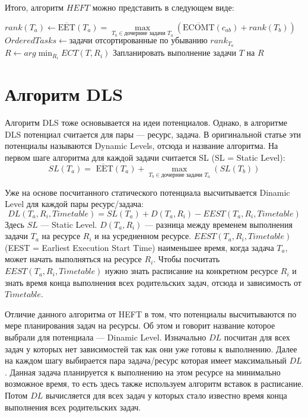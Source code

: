 \begin{spacing}{1.5}
Итого, алгоритм $HEFT$ можно представить в следующем виде:


\begin{algorithmic}
\STATE $rank(T_a) \leftarrow \overline{\mbox{EET}}(T_a) = \max\limits_{T_b \in \text{дочерние задачи $T_a$}}(\overline{\mbox{ECOMT}} (c_{ab}) + rank (T_b))$
\ENDFOR
\STATE $OrderedTasks \leftarrow \text{задачи отсортированные по убыванию $rank_{T_a}$}$
\STATE $R \leftarrow arg\min_{R_i} ECT(T, R_i)$
\STATE Запланировать выполнение задачи $T$ на $R$
\ENDFOR
\end{algorithmic}

\newpage
\section*{Алгоритм DLS}

Алгоритм DLS тоже основывается на идеи потенциалов. Однако, в алгоритме DLS потенциал считается для пары --- ресурс, задача. В оригинальной статье эти потенциалы называются Dynamic Levels, отсюда и название алгоритма. На первом шаге алгоритма для каждой задачи считается SL (SL = Static Level):
$$
SL(T_a) = \overline{\mbox{ EET}}(T_a) + \max_{T_b \in \text{дочерние задачи $T_a$}}(SL (T_b))
$$

Уже на основе посчитанного статического потенциала высчитывается Dinamic Level для каждой пары ресурс/задача:
$$
DL(T_a, R_i, Timetable) = SL(T_a) + D(T_a, R_i) - EEST(T_a, R_i, Timetable)
$$
Здесь $SL$ --- Static Level. $D(T_a, R_i)$ --- разница между временем выполнения задачи $T_a$ на ресурсе $R_i$ и на усредненном ресурсе. $EEST(T_a, R_i, Timetable)$ (EEST = Earliest Execution Start Time) наименьшее время, когда задача $T_a$, может начать выполняться на ресурсе $R_i$. Чтобы посчитать $EEST(T_a, R_i, Timetable)$ нужно знать расписание на конкретном ресурсе $R_i$ и знать время конца выполнения всех родительских задач,  отсюда и зависимость от $Timetable$. 

Отличие данного алгоритма от HEFT в том, что потенциалы высчитываются по мере планирования задач на ресурсы. Об этом и говорит название которое выбрали для потенциала --- Dinamic Level. Изначально $DL$ посчитан для всех задач у которых нет зависимостей так как они уже готовы к выполнению. Далее на каждом шагу выбирается пара задача/ресурс которая имеет максимальный $DL$. Данная задача планируется к выполнению на этом ресурсе на минимально возможное время, то есть здесь также используем алгоритм вставок в расписание. Потом $DL$ вычисляется для всех задач у которых стало известно время конца выполнения всех родительских задач.


\end{spacing}
